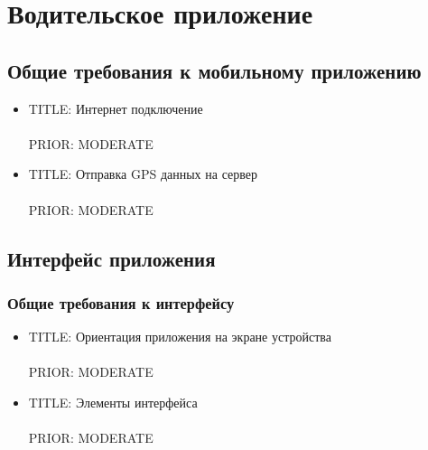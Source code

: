 \section{Водительское приложение}


  \subsection{Общие требования к мобильному приложению}

    \begin{itemize}

      \item{
        TITLE: Интернет подключение\\
        \\
        PRIOR: MODERATE\\}

      \item{
        TITLE: Отправка GPS данных на сервер\\
        \\
        PRIOR: MODERATE\\}

    \end{itemize}

  \subsection{Интерфейс приложения}
   
    \subsubsection{Общие требования к интерфейсу}
      \begin{itemize}

        \item{
          TITLE: Ориентация приложения на экране устройства\\
          \\
          PRIOR: MODERATE\\}

        \item{
          TITLE: Элементы интерфейса\\
          \\
          PRIOR: MODERATE\\}

      \end{itemize}

